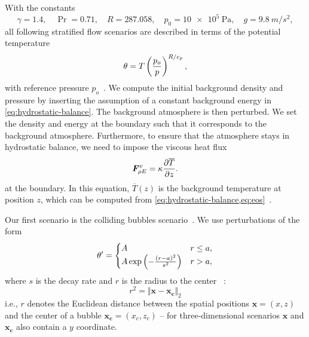 \documentclass[runningheads]{llncs}
\newcommand{\eqA}{}
\newcommand{\eqB}{(}
\newcommand{\eqMultiA}{(}
\newcommand{\eqMultiB}{)}
\DeclareRobustCommand{\pcrefSingle}[1]{%
\begingroup%
  \renewcommand{\eqA}{(}\renewcommand{\eqB}{}%
\cref{#1}%
\endgroup%
}
\DeclareRobustCommand{\pcrefMulti}[1]{%
\begingroup%
    \renewcommand{\eqMultiA}{}\renewcommand{\eqMultiB}{}%
    (\cref{#1})%
\endgroup%
}
\DeclareRobustCommand{\pcref}[1]{%
\IfSubStr{#1}{,}{\pcrefMulti{#1}}{\pcrefSingle{#1}}%
}
\begin{document}
With  the constants
\begin{equation}\label{eq:atmosphere-constants}
    \gamma = 1.4 ,\quad \Pr =  0.71 ,\quad R = 287.058 ,\quad p_0 = \SI{10e5}{\Pa}, \quad g = \SI{9.8}{m/s^2},
\end{equation}
all following stratified flow scenarios are described in terms of the potential temperature
\begin{equation}
  \theta = T \left( \frac{p_o}{p} \right)^{R/c_p},
\end{equation}
with reference pressure $p_o$~\cite{muller2010adaptive,giraldo2008study}.
%
We compute the initial background density and pressure by inserting the assumption of a constant background energy in \cref{eq:hydrostatic-balance}.
The background atmosphere is then perturbed.
We set the density and energy at the boundary such that it corresponds to the background atmosphere.
Furthermore, to ensure that the atmosphere stays in hydrostatic balance, we need to impose the viscous heat flux
\begin{equation}
  \label{eq:atmosphere-bc}
  \viscFlux_{\QE} = \kappa \pdv{\overline{T}}{z}.%
\end{equation}
at the boundary.
In this equation, $\overline{T}(z)$ is the background temperature at position $z$, which can be computed from \cref{eq:hydrostatic-balance,eq:eos}~\cite{giraldo2008study}.

Our first scenario is the colliding bubbles scenario~\cite{muller2010adaptive}.
We use perturbations of the form
\begin{equation}
  \label{eq:bubbles-pertubation}
  \theta' =
  \begin{cases}
    A & r \leq a, \\
    A \exp \left( - \frac{(r-a)^2}{s^2} \right) & r > a,
    \end{cases}
\end{equation}
where $s$ is the decay rate and $r$  is the radius to the center~\pcref{eq:radius}:
\begin{equation}
  \label{eq:radius}
  r^2 = \Vert \bm{x} - \bm{x_c} \Vert_2
\end{equation}
i.e., $r$ denotes the Euclidean distance between the spatial positions $\bm{x} = (x, z)$ and the center of a bubble $\bm{x_c} = (x_c, z_c)$ -- for three-dimensional scenarios $\bm{x}$ and $\bm{x_c}$ also contain a $y$ coordinate.
\end{document}
